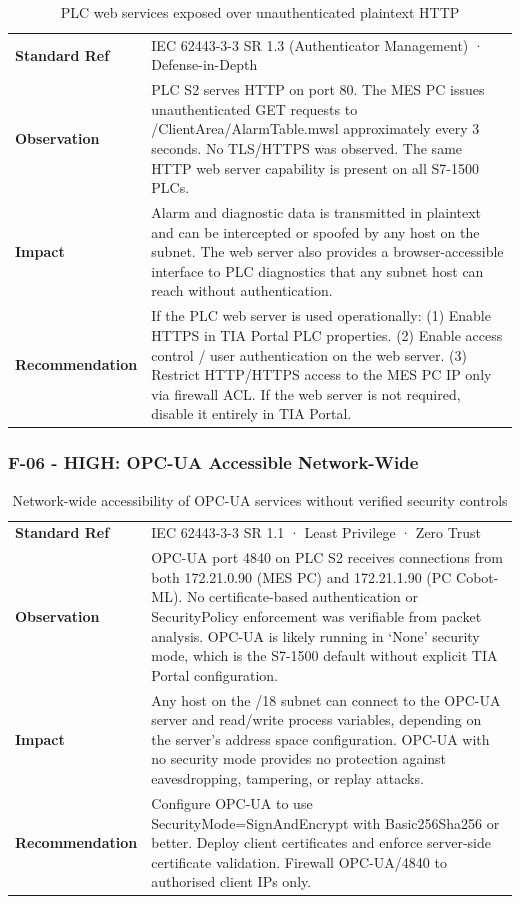 \begin{table}[H]
\centering
\begin{tabular}{@{}p{}p{}@{}}
\toprule
\textbf{Standard Ref} & IEC 62443-3-3 SR 1.3 (Authenticator Management) · Defense-in-Depth \\
\textbf{Observation} & PLC S2 serves HTTP on port 80. The MES PC issues unauthenticated GET requests to /ClientArea/AlarmTable.mwsl approximately every 3 seconds. No TLS/HTTPS was observed. The same HTTP web server capability is present on all S7-1500 PLCs. \\
\textbf{Impact} & Alarm and diagnostic data is transmitted in plaintext and can be intercepted or spoofed by any host on the subnet. The web server also provides a browser-accessible interface to PLC diagnostics that any subnet host can reach without authentication. \\
\textbf{Recommendation} & If the PLC web server is used operationally: (1) Enable HTTPS in TIA Portal PLC properties. (2) Enable access control / user authentication on the web server. (3) Restrict HTTP/HTTPS access to the MES PC IP only via firewall ACL. If the web server is not required, disable it entirely in TIA Portal. \\
\bottomrule
\end{tabular}
\caption{PLC web services exposed over unauthenticated plaintext HTTP}
\end{table}

\subsubsection{F-06 - HIGH: OPC-UA Accessible Network-Wide}

\begin{table}[H]
\centering
\begin{tabular}{@{}p{}p{}@{}}
\toprule
\textbf{Standard Ref} & IEC 62443-3-3 SR 1.1 · Least Privilege · Zero Trust \\
\textbf{Observation} & OPC-UA port 4840 on PLC S2 receives connections from both 172.21.0.90 (MES PC) and 172.21.1.90 (PC Cobot-ML). No certificate-based authentication or SecurityPolicy enforcement was verifiable from packet analysis. OPC-UA is likely running in `None' security mode, which is the S7-1500 default without explicit TIA Portal configuration. \\
\textbf{Impact} & Any host on the /18 subnet can connect to the OPC-UA server and read/write process variables, depending on the server's address space configuration. OPC-UA with no security mode provides no protection against eavesdropping, tampering, or replay attacks. \\
\textbf{Recommendation} & Configure OPC-UA to use SecurityMode=SignAndEncrypt with Basic256Sha256 or better. Deploy client certificates and enforce server-side certificate validation. Firewall OPC-UA/4840 to authorised client IPs only. \\
\bottomrule
\end{tabular}
\caption{Network-wide accessibility of OPC-UA services without verified security controls}
\end{table}

